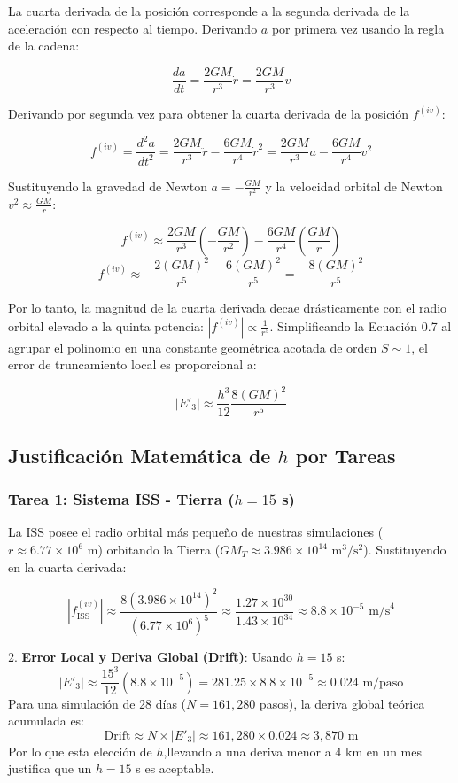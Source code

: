 \documentclass[11pt, a4paper]{article}
\begin{document}
	La cuarta derivada de la posición corresponde a la segunda derivada de la aceleración con respecto al tiempo. Derivando $a$ por primera vez usando la regla de la cadena:
	
	$$ \frac{da}{dt} = \frac{2GM}{r^3}\dot{r} = \frac{2GM}{r^3}v $$
	
	Derivando por segunda vez para obtener la cuarta derivada de la posición $f^{(iv)}$:
	
	$$ f^{(iv)} = \frac{d^2a}{dt^2} = \frac{2GM}{r^3}\ddot{r} - \frac{6GM}{r^4}\dot{r}^2 = \frac{2GM}{r^3}a - \frac{6GM}{r^4}v^2 $$
	
	Sustituyendo la gravedad de Newton $a = -\frac{GM}{r^2}$ y la velocidad orbital de Newton $v^2 \approx \frac{GM}{r}$:
	
	$$ f^{(iv)} \approx \frac{2GM}{r^3}\left(-\frac{GM}{r^2}\right) - \frac{6GM}{r^4}\left(\frac{GM}{r}\right) $$
	$$ f^{(iv)} \approx -\frac{2(GM)^2}{r^5} - \frac{6(GM)^2}{r^5} = -\frac{8(GM)^2}{r^5} $$
	
	Por lo tanto, la magnitud de la cuarta derivada decae drásticamente con el radio orbital elevado a la quinta potencia: $|f^{(iv)}| \propto \frac{1}{r^5}$. Simplificando la Ecuación 0.7 al agrupar el polinomio en una constante geométrica acotada de orden $S \sim 1$, el error de truncamiento local es proporcional a:
	
	$$ |E'_3| \approx \frac{h^3}{12} \frac{8(GM)^2}{r^5} $$
	
	\subsection{Justificación Matemática de $h$ por Tareas}
	
	\subsubsection{Tarea 1: Sistema ISS - Tierra ($h = 15$ s)}
	
	La ISS posee el radio orbital más pequeño de nuestras simulaciones ($r \approx 6.77 \times 10^6$ m) orbitando la Tierra ($GM_T \approx 3.986 \times 10^{14} \text{ m}^3/\text{s}^2$).  Sustituyendo en la cuarta derivada:
	
	$$ |f^{(iv)}_{\text{ISS}}| \approx \frac{8(3.986 \times 10^{14})^2}{(6.77 \times 10^6)^5} \approx \frac{1.27 \times 10^{30}}{1.43 \times 10^{34}} \approx 8.8 \times 10^{-5} \text{ m/s}^4 $$
	
	2. \textbf{Error Local y Deriva Global (Drift)}:
	Usando $h = 15$ s:
	$$ |E'_3| \approx \frac{15^3}{12} (8.8 \times 10^{-5}) = 281.25 \times 8.8 \times 10^{-5} \approx 0.024 \text{ m/paso} $$
	Para una simulación de 28 días ($N = 161,280$ pasos), la deriva global teórica acumulada es:
	$$ \text{Drift} \approx N \times |E'_3| \approx 161,280 \times 0.024 \approx 3,870 \text{ m} $$
	Por lo que esta elección de $h$,llevando a una deriva menor a 4 km en un mes justifica que un $h=15$ s es aceptable.
	
\end{document}
